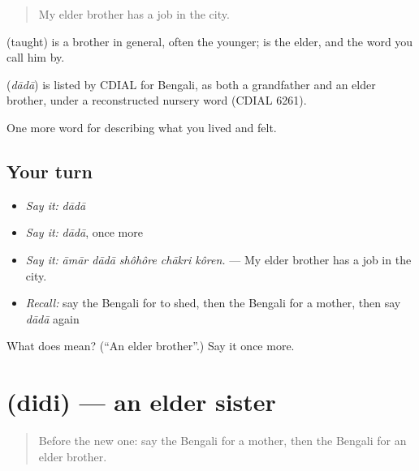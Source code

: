 \begin{quote}
My elder brother has a job in the city.
\end{quote}

 (taught) is a brother in general, often the younger;  is the elder, and the word you call him by.

\begin{cousinweb}
\textbf{} (\emph{dādā}) is listed by CDIAL for Bengali, as both a grandfather and an elder brother, under a reconstructed nursery word (CDIAL 6261).
\end{cousinweb}

\begin{grammarlens}[title={What you've built}]
One more word for describing what you lived and felt.
\end{grammarlens}

\subsection*{Your turn}
\begin{itemize}
\raggedright
  \item \emph{Say it:} \emph{dādā}
  \item \emph{Say it:} \emph{dādā}, once more
  \item \emph{Say it:} \emph{āmār dādā shôhôre chākri kôren.} — My elder brother has a job in the city.
  \item \emph{Recall:} say the Bengali for to shed, then the Bengali for a mother, then say \emph{dādā} again
\end{itemize}

\begin{tcolorbox}[breakable,colback=teal!4,colframe=teal!35!black,title={Before you move on}]
What does  mean? (\textquotedblleft{}An elder brother\textquotedblright{}.) Say it once more.
\end{tcolorbox}
\section[\texorpdfstring{\bn{দিদি} (didi)}{দিদি (didi)}]{ (didi) — an elder sister}

\label{lesson:BN-C481-didi}



\begin{quote}
Before the new one: say the Bengali for a mother, then the Bengali for an elder brother.
\end{quote}

